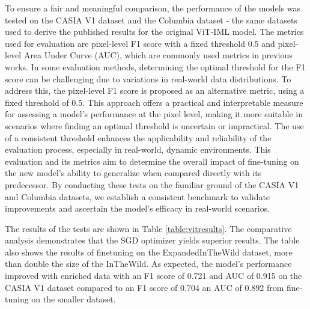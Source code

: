 To ensure a fair and meaningful comparison, the performance of the models was tested on the CASIA V1 dataset and the Columbia dataset - the same datasets used to derive the published results for the original ViT-IML model. The metrics used for evaluation are pixel-level F1 score with a fixed threshold 0.5 and pixel-level Area Under Curve (AUC), which are commonly used metrics in previous works. In some evaluation methods, determining the optimal threshold for the F1 score can be challenging due to variations in real-world data distributions. To address this, the pixel-level F1 score is proposed as an alternative metric, using a fixed threshold of 0.5. This approach offers a practical and interpretable measure for assessing a model's performance at the pixel level, making it more suitable in scenarios where finding an optimal threshold is uncertain or impractical. The use of a consistent threshold enhances the applicability and reliability of the evaluation process, especially in real-world, dynamic environments. This evaluation and its metrics aim to determine the overall impact of fine-tuning on the new model's ability to generalize when compared directly with its predecessor. By conducting these tests on the familiar ground of the CASIA V1 and Columbia datasets, we establish a consistent benchmark to validate improvements and ascertain the model's efficacy in real-world scenarios.

The results of the tests are shown in Table \ref{table:vitresults}. The comparative analysis demonstrates that the SGD optimizer yields superior results. The table also shows the results of finetuning on the ExpandedInTheWild dataset, more than double the size of the InTheWild. As expected, the model's performance improved with enriched data with an F1 score of 0.721  and AUC of 0.915 on the CASIA V1 dataset compared to an F1 score of 0.704 an AUC of 0.892 from fine-tuning on the smaller dataset.



